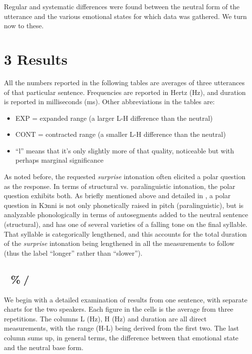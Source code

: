 \documentclass[output=paper]{langsci/langscibook}
\begin{document}
Regular and systematic differences were found between the neutral form of the utterance and the various emotional states for which data was gathered. We turn now to these. 

\chapter{3 Results }
\begin{styleBodyTextIndent}
All the numbers reported in the following tables are averages of three utterances of that particular sentence. Frequencies are reported in Hertz (Hz), and duration is reported in milliseconds (ms). Other abbreviations in the tables are: 
\end{styleBodyTextIndent}

\begin{itemize}
\item EXP = expanded range (a larger L-H difference than the neutral)
\item CONT = contracted range (a smaller L-H difference than the neutral)
\item “l” means that it’s only slightly more of that quality, noticeable but with perhaps marginal significance 
\end{itemize}

As noted before, the requested \emph{surprise} intonation often elicited a polar question as the response. In terms of structural vs. paralinguistic intonation, the polar question exhibits both. As briefly mentioned above and detailed in \citet{Cahill2012}, a polar question in Kɔnni is not only phonetically raised in pitch (paralinguistic), but is analyzable phonologically in terms of autosegments added to the neutral sentence (structural), and has one of several varieties of a falling tone on the final syllable. That syllable is categorically lengthened, and this accounts for the total duration of the \emph{surprise} intonation being lengthened in all the measurements to follow (thus the label “longer” rather than “slower”).

\section{ \%/}
\begin{styleBodyTextIndent}
We begin with a detailed examination of results from one sentence, with separate charts for the two speakers. Each figure in the cells is the average from three repetitions. The columns L (Hz), H (Hz) and duration are all direct measurements, with the range (H-L) being derived from the first two. The last column sums up, in general terms, the difference between that emotional state and the neutral base form. 
\end{styleBodyTextIndent}
\end{document}
